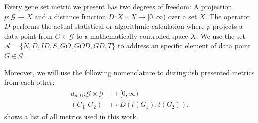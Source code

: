 \documentclass{thesisclass}
\begin{document}
Every gene set metric we present has two degrees of freedom: A projection $p : \mathcal{G} \to X$ and a distance function $D: X \times X \to [0, \infty)$ over a set $X$. The operator $D$ performs the actual statistical or algorithmic calculation where $p$ projects a data point from $G \in \mathcal{G}$ to a mathematically controlled space $X$. We use the set $\mathcal{A}  = \lbrace{N,D, ID, S,GO, GOD, GD,T \rbrace}$ to address an specific element of data point $G \in \mathcal{G}$.

Moreover, we will use the following nomenclature to distinguish presented metrics from each other:
\begin{align} \label{eq:metric_def}
	\begin{split}
		d_{p, D} \colon \mathcal{G} \times \mathcal{G} & \to [0, \infty) \\
		(G_1,G_2) & \mapsto D \left( t(G_1), t(G_2) \right).
	\end{split}
\end{align}
 shows a list of all metrics used in this work.
\end{document}
